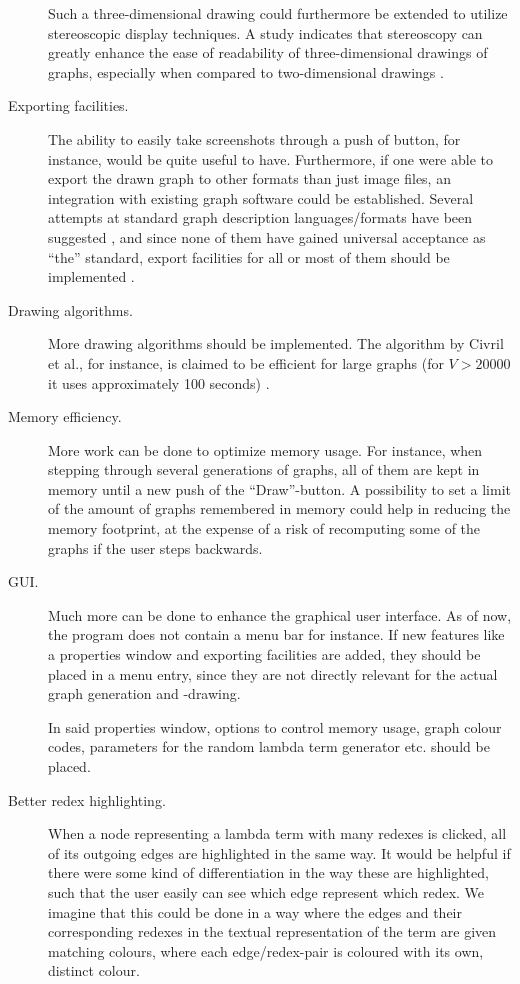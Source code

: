 \begin{description}
	Such a three-dimensional drawing could furthermore be extended to utilize stereoscopic
	display techniques. A study indicates that stereoscopy can greatly enhance the ease of 
	readability of three-dimensional drawings of graphs, especially when compared 
	to two-dimensional drawings \cite{Ware2008}.
	
	\item[Exporting facilities.] The ability to easily take screenshots through 
	a push of button, for instance, would be quite useful to have. Furthermore,
	if one were able to export the drawn graph to other formats than just image files,
	an integration with existing graph software could be established. Several
	attempts at standard graph description languages/formats have been suggested
	\cite{GraphML,GXL,DOT,XGMML}, and since none of them have gained universal 
	acceptance as ``the'' standard, export facilities for all or most of them 
	should be implemented .
	
	\item[Drawing algorithms.] More drawing algorithms should be implemented. 
	The algorithm by Civril et al., for instance, is claimed to be efficient for
	large graphs (for $V>20000$ it uses approximately 100 seconds) \cite{Civril2005}.
	
	\item[Memory efficiency.] More work can be done to optimize memory usage. 
	For instance, when stepping through several generations of graphs, all of
	them are kept in memory until a new push of the ``Draw''-button. A possibility
	to set a limit of the amount of graphs remembered in memory could help in reducing
	the memory footprint, at the expense of a risk of recomputing some of the graphs
	if the user steps backwards.
	
	\item[GUI.] Much more can be done to enhance the graphical user interface. 
	As of now, the program does not contain a menu bar for instance. If new features
	like a properties window and exporting facilities are added, they should be
	placed in a menu entry, since they are not directly relevant for the actual
	graph generation and -drawing. 
	
	In said properties window, options to control memory usage, graph colour codes,
	parameters for the random lambda term generator etc. should be placed.
	
	\item[Better redex highlighting.] When a node representing a lambda term with 
	many redexes is clicked, all of its outgoing edges are highlighted in the same
	way. It would be helpful if there were some kind of differentiation in the way
	these are highlighted, such that the user easily can see which edge represent
	which redex. We imagine that this could be done in a way where the edges and their
	corresponding redexes in the textual representation of the term are given
	matching colours, where each edge/redex-pair is coloured with its own, distinct
	colour.
	

\end{description}
